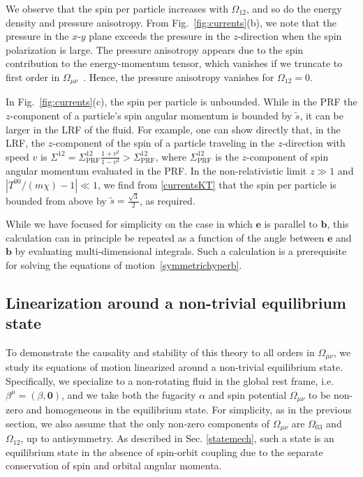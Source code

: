 \documentclass[12pt,aps,prd,nofootinbib,noshowkeys,noshowpacs,longbibliography,
superscriptaddress,tightenlines,floatfix,preprintnumbers]{revtex4-2}
\begin{document}
We observe that the spin per particle increases with $\Omega_{12}$, and so do the energy density and pressure anisotropy. From Fig.~\ref{fig:currents}(b), we note that the pressure in the $x$-$y$ plane exceeds the pressure in the $z$-direction when the spin polarization is large. The pressure anisotropy appears due to the spin contribution to the energy-momentum tensor, which vanishes if we truncate to first order in $\Omega_{\mu\nu}$~\cite{Florkowski:2019qdp}. Hence, the pressure anisotropy vanishes for $\Omega_{12}=0$.


In Fig.~\ref{fig:currents}(c), the spin per particle is unbounded. While in the PRF the $z$-component of a particle's spin angular momentum is bounded by $\tilde{s}$, it can be larger in the LRF of the fluid. For example, one can show directly that, in the LRF, the $z$-component of the spin of a particle traveling in the $z$-direction with speed $v$ is $\Sigma^{12} = \Sigma^{12}_\text{PRF} \frac{1+v^2}{1-v^2} > \Sigma^{12}_\text{PRF}$, where $\Sigma^{12}_\text{PRF}$ is the $z$-component of spin angular momentum evaluated in the PRF. In the non-relativistic limit $z \gg 1$ and $|T^{00}/(m\chi) - 1| \ll 1$, we find from \eqref{currentsKT} that the spin per particle is bounded from above by $\tilde{s} = \frac{\sqrt 3}{2}$, as required.

While we have focused for simplicity on the case in which $\bm e$ is parallel to $\bm b$, this calculation can in principle be repeated as a function of the angle between $\bm e$ and $\bm b$ by evaluating multi-dimensional integrals. Such a calculation is a prerequisite for solving the equations of motion~\eqref{symmetrichyperb}.


%
\subsection{Linearization around a non-trivial equilibrium state}

To demonstrate the causality and stability of this theory to all orders in $\Omega_{\mu\nu}$, we study its equations of motion linearized around a non-trivial equilibrium state. Specifically, we specialize to a non-rotating fluid in the global rest frame, i.e.~$\beta^\mu = (\beta, \bm 0)$, and we take both the fugacity $\alpha$ and spin potential $\Omega_{\mu\nu}$ to be non-zero and homogeneous in the equilibrium state. For simplicity, as in the previous section, we also assume that the only non-zero components of $\Omega_{\mu\nu}$ are $\Omega_{03}$ and $\Omega_{12}$, up to antisymmetry. As described in Sec. \ref{statemech}, such a state is an equilibrium state in the absence of spin-orbit coupling due to the separate conservation of spin and orbital angular momenta.
\end{document}
